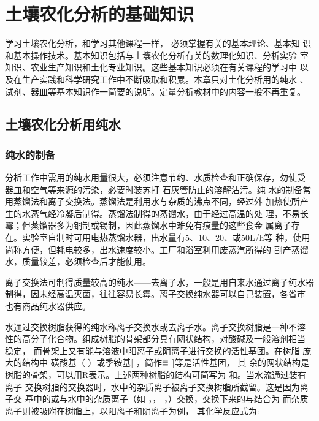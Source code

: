 \chapter{土壤农化分析的基础知识}

学习土壤农化分析，和学习其他课程一样， 必须掌握有关的基本理论、基本知
识和基本操作技术。基本知识包括与土壤农化分析有关的数理化知识、分析实验
室知识、农业生产知识和土化专业知识。这些基本知识必须在有关课程的学习中
以及在生产实践和科学研究工作中不断吸取和积累。本章只对土化分析用的纯水
、试剂、器皿等基本知识作一简要的说明。定量分析教材中的内容一般不再重复。

\section{土壤农化分析用纯水}
\subsection{纯水的制备}

分析工作中需用的纯水用量很大，必须注意节约、水质检查和正确保存，勿使受
器皿和空气等来源的污染，必要时装苏打-石灰管防止的溶解沾污。纯
水的制备常用蒸馏法和离子交换法。蒸馏法是利用水与杂质的沸点不同，经过外
加热使所产生的水蒸气经冷凝后制得。蒸馏法制得的蒸馏水，由于经过高温的处
理，不易长霉；但蒸馏器多为铜制或锡制，因此蒸馏水中难免有痕量的这些食金
属离子存在。实验室自制时可用电热蒸馏水器，出水量有5、10、20、或50L/h等
种，使用尚称方便，但耗电较多，出水速度较小。工厂和浴室利用废蒸汽所得的
副产蒸馏水，质量较差，必须检查后才能使用。

离子交换法可制得质量较高的纯水——去离子水，一般是用自来水通过离子纯水器
制得，因未经高温灭菌，往往容易长霉。离子交换纯水器可以自己装置，各省市
也有商品纯水器供应。

水通过交换树脂获得的纯水称离子交换水或去离子水。离子交换树脂是一种不溶
性的高分子化合物。组成树脂的骨架部分具有网状结构，对酸碱及一般溶剂相当
稳定， 而骨架上又有能与溶液中阳离子或阴离子进行交换的活性基团。在树脂
庞大的结构中 磺酸基（ ）或季铵基[  
，简作$\superequiv$ ]等是活性基团， 其
余的网状结构是树脂的骨架，可以用R表示。上述两种树脂的结构可简写为
和。当水流通过装有离子
交换树脂的交换器时，水中的杂质离子被离子交换树脂所截留。这是因为离子交
基中的或与水中的杂质离子（如 ，，
，）交换，交换下来的与结合为
而杂质离子则被吸附在树脂上，以阳离子和阴离子为例，
其化学反应式为:

